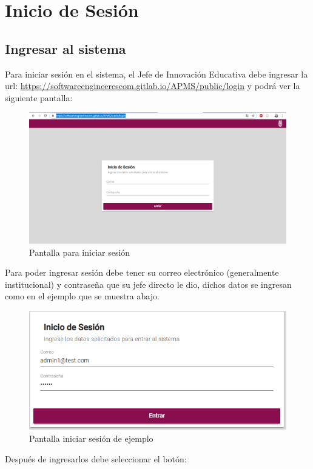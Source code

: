 \section{Inicio de Sesión}

    \subsection{Ingresar al sistema}
        Para iniciar sesión en el sistema, el Jefe de Innovación Educativa debe ingresar la url: \url{https://softwareengineerescom.gitlab.io/APMS/public/login} y podrá ver la siguiente pantalla:

        \begin{figure}[H]
            \centering
            \hypertarget{iniciarS}{\includegraphics[width=0.7\linewidth]{images/SP5/IniciarSesion}}
            \caption{Pantalla para iniciar sesión}
        \end{figure}
        \clearpage
        Para poder ingresar sesión debe tener su correo electrónico (generalmente institucional) y contraseña que su jefe directo le dio, dichos datos se ingresan como en el ejemplo que se muestra abajo.

        \begin{figure}[H]
            \centering
            \hypertarget{iniciarL}{\includegraphics[width=0.5\linewidth]{images/SP5/ejemploIniciar}}
            \caption{Pantalla iniciar sesión de ejemplo}
        \end{figure}

        Después de ingresarlos debe seleccionar el botón:

